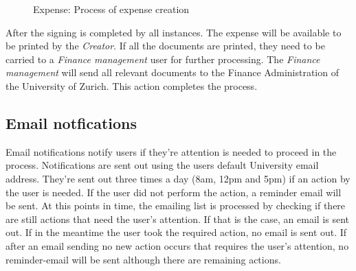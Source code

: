 \begin{figure}[H]
    \centering
    \caption{Expense: Process of expense creation}
    \label{fig:expense-process}
\end{figure}

After the signing is completed by all instances. The expense will be available to be printed by the \textit{Creator}. If all the documents are printed, they need to be carried to a \textit{Finance management} user for further processing. The \textit{Finance management} will send all relevant documents to the Finance Administration of the University of Zurich. This action completes the process.

\subsection{Email notfications}

Email notifications notify users if they're attention is needed to proceed in the process. Notifications are sent out using the users default University email address. They're sent out three times a day (8am, 12pm and 5pm) if an action by the user is needed. If the user did not perform the action, a reminder email will be sent. At this points in time, the emailing list is processed by checking if there are still actions that need the user’s attention. If that is the case, an email is sent out. If in the meantime the user took the required action, no email is sent out. If after an email sending no new action occurs that requires the user’s attention, no reminder-email will be sent although there are remaining actions.
